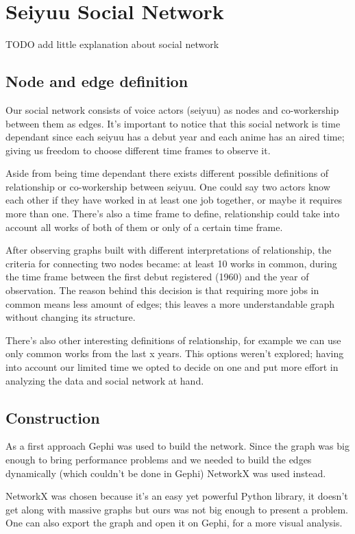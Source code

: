 \section{Seiyuu Social Network}
TODO add little explanation about social network

\subsection{Node and edge definition}
Our social network consists of voice actors (seiyuu) as nodes and co-workership between them as edges. It's important to notice that this social network is time dependant since each seiyuu has a debut year and each anime has an aired time; giving us freedom to choose different time frames to observe it.

Aside from being time dependant there exists different possible definitions of relationship or co-workership between seiyuu. One could say two actors know each other if they have worked in at least one job together, or maybe it requires more than one. There’s also a time frame to define, relationship could take into account all works of both of them or only of a certain time frame.

After observing graphs built with different interpretations of relationship, the criteria for connecting two nodes became: at least 10 works in common, during the time frame between the first debut registered (1960) and the year of observation.
The reason behind this decision is that requiring more jobs in common means less amount of edges; this leaves a more understandable graph without changing its structure.

There's also other interesting definitions of relationship, for example we can use only common works from the last x years. This options weren't explored; having into account our limited time we opted to decide on one and put more effort in analyzing the data and social network at hand.

\subsection{Construction}
As a first approach Gephi was used to build the network. Since the graph was big enough to bring performance problems and we needed to build the edges dynamically (which couldn't be done in Gephi) NetworkX was used instead.

NetworkX was chosen because it's an easy yet powerful Python library, it doesn't get along with massive graphs but ours was not big enough to present a problem. One can also export the graph and open it on Gephi, for a more visual analysis.


